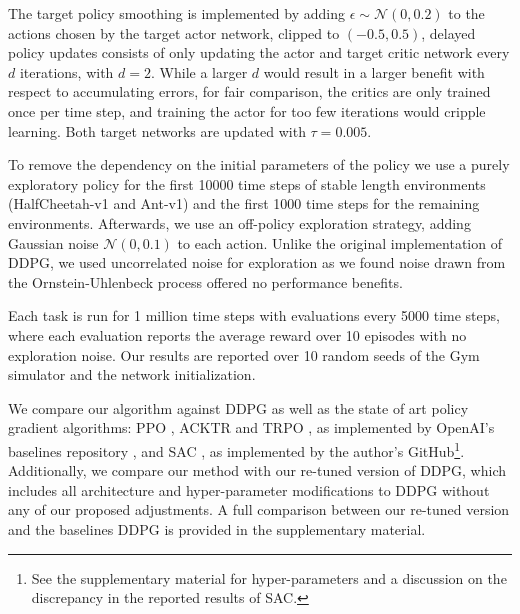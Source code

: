 \documentclass{article}
\newcommand{\e}{\epsilon}
\newcommand{\N}{\mathcal{N}}
\begin{document}
The target policy smoothing is implemented by adding $\e \sim \N(0, 0.2)$ to the actions chosen by the target actor network, clipped to $(-0.5, 0.5)$, delayed policy updates consists of only updating the actor and target critic network every $d$ iterations, with $d=2$. While a larger $d$ would result in a larger benefit with respect to accumulating errors, for fair comparison, the critics are only trained once per time step, and training the actor for too few iterations would cripple learning. Both target networks are updated with $\tau=0.005$. 

To remove the dependency on the initial parameters of the policy we use a purely exploratory policy for the first 10000 time steps of stable length environments (HalfCheetah-v1 and Ant-v1) and the first 1000 time steps for the remaining environments. Afterwards, we use an off-policy exploration strategy, adding Gaussian noise $\mathcal{N}(0, 0.1)$ to each action. Unlike the original implementation of DDPG, we used uncorrelated noise for exploration as we found noise drawn from the Ornstein-Uhlenbeck \cite{uhlenbeck1930theory} process offered no performance benefits.

Each task is run for 1 million time steps with evaluations every 5000 time steps, where each evaluation reports the average reward over 10 episodes with no exploration noise. Our results are reported over 10 random seeds of the Gym simulator and the network initialization. 

We compare our algorithm against DDPG \cite{DDPG} as well as the state of art policy gradient algorithms: PPO \cite{ppo}, ACKTR \cite{acktr} and TRPO \cite{trpo}, as implemented by OpenAI's baselines repository \cite{baselines}, and SAC \cite{haarnoja2018soft}, as implemented by the author's GitHub\footnote{See the supplementary material for hyper-parameters and a discussion on the discrepancy in the reported results of SAC.}. 
Additionally, we compare our method with our re-tuned version of DDPG, which includes all architecture and hyper-parameter modifications to DDPG without any of our proposed adjustments. 
A full comparison between our re-tuned version and the baselines DDPG is provided in the supplementary material.
\end{document}
